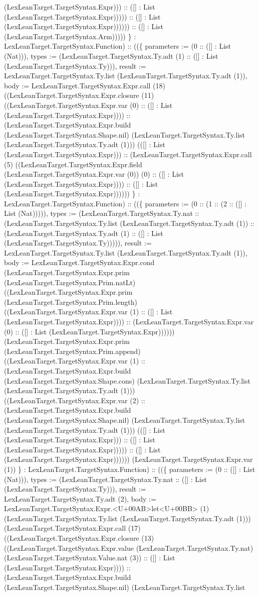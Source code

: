 \documentclass[11pt]{article}
\begin{document}
(LexLeanTarget.TargetSyntax.Expr))) :: ([] : List (LexLeanTarget.TargetSyntax.Expr))))) :: ([] : List (LexLeanTarget.TargetSyntax.Expr)))))) :: ([] : List (LexLeanTarget.TargetSyntax.Arm))))) \} : LexLeanTarget.TargetSyntax.Function) :: ((\{ parameters := (0 :: ([] : List (Nat))), types := (LexLeanTarget.TargetSyntax.Ty.adt (1) :: ([] : List (LexLeanTarget.TargetSyntax.Ty))), result := LexLeanTarget.TargetSyntax.Ty.list (LexLeanTarget.TargetSyntax.Ty.adt (1)), body := LexLeanTarget.TargetSyntax.Expr.call (18) ((LexLeanTarget.TargetSyntax.Expr.closure (11) ((LexLeanTarget.TargetSyntax.Expr.var (0) :: ([] : List (LexLeanTarget.TargetSyntax.Expr)))) :: (LexLeanTarget.TargetSyntax.Expr.build (LexLeanTarget.TargetSyntax.Shape.nil) (LexLeanTarget.TargetSyntax.Ty.list (LexLeanTarget.TargetSyntax.Ty.adt (1))) (([] : List (LexLeanTarget.TargetSyntax.Expr))) :: (LexLeanTarget.TargetSyntax.Expr.call (5) ((LexLeanTarget.TargetSyntax.Expr.field (LexLeanTarget.TargetSyntax.Expr.var (0)) (0) :: ([] : List (LexLeanTarget.TargetSyntax.Expr)))) :: ([] : List (LexLeanTarget.TargetSyntax.Expr)))))) \} : LexLeanTarget.TargetSyntax.Function) :: ((\{ parameters := (0 :: (1 :: (2 :: ([] : List (Nat))))), types := (LexLeanTarget.TargetSyntax.Ty.nat :: (LexLeanTarget.TargetSyntax.Ty.list (LexLeanTarget.TargetSyntax.Ty.adt (1)) :: (LexLeanTarget.TargetSyntax.Ty.adt (1) :: ([] : List (LexLeanTarget.TargetSyntax.Ty))))), result := LexLeanTarget.TargetSyntax.Ty.list (LexLeanTarget.TargetSyntax.Ty.adt (1)), body := LexLeanTarget.TargetSyntax.Expr.cond (LexLeanTarget.TargetSyntax.Expr.prim (LexLeanTarget.TargetSyntax.Prim.natLt) ((LexLeanTarget.TargetSyntax.Expr.prim (LexLeanTarget.TargetSyntax.Prim.length) ((LexLeanTarget.TargetSyntax.Expr.var (1) :: ([] : List (LexLeanTarget.TargetSyntax.Expr)))) :: (LexLeanTarget.TargetSyntax.Expr.var (0) :: ([] : List (LexLeanTarget.TargetSyntax.Expr)))))) (LexLeanTarget.TargetSyntax.Expr.prim (LexLeanTarget.TargetSyntax.Prim.append) ((LexLeanTarget.TargetSyntax.Expr.var (1) :: (LexLeanTarget.TargetSyntax.Expr.build (LexLeanTarget.TargetSyntax.Shape.cons) (LexLeanTarget.TargetSyntax.Ty.list (LexLeanTarget.TargetSyntax.Ty.adt (1))) ((LexLeanTarget.TargetSyntax.Expr.var (2) :: (LexLeanTarget.TargetSyntax.Expr.build (LexLeanTarget.TargetSyntax.Shape.nil) (LexLeanTarget.TargetSyntax.Ty.list (LexLeanTarget.TargetSyntax.Ty.adt (1))) (([] : List (LexLeanTarget.TargetSyntax.Expr))) :: ([] : List (LexLeanTarget.TargetSyntax.Expr))))) :: ([] : List (LexLeanTarget.TargetSyntax.Expr)))))) (LexLeanTarget.TargetSyntax.Expr.var (1)) \} : LexLeanTarget.TargetSyntax.Function) :: ((\{ parameters := (0 :: ([] : List (Nat))), types := (LexLeanTarget.TargetSyntax.Ty.nat :: ([] : List (LexLeanTarget.TargetSyntax.Ty))), result := LexLeanTarget.TargetSyntax.Ty.adt (2), body := LexLeanTarget.TargetSyntax.Expr.<U+00AB>let<U+00BB> (1) (LexLeanTarget.TargetSyntax.Ty.list (LexLeanTarget.TargetSyntax.Ty.adt (1))) (LexLeanTarget.TargetSyntax.Expr.call (17) ((LexLeanTarget.TargetSyntax.Expr.closure (13) ((LexLeanTarget.TargetSyntax.Expr.value (LexLeanTarget.TargetSyntax.Ty.nat) (LexLeanTarget.TargetSyntax.Value.nat (3)) :: ([] : List (LexLeanTarget.TargetSyntax.Expr)))) :: (LexLeanTarget.TargetSyntax.Expr.build (LexLeanTarget.TargetSyntax.Shape.nil) (LexLeanTarget.TargetSyntax.Ty.list 
\end{document}
